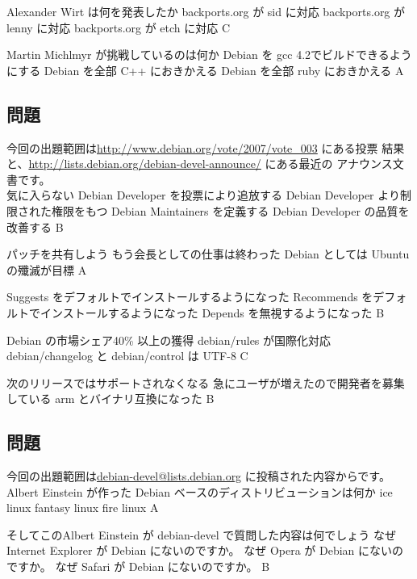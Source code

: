 \documentclass[mingoth,a4paper]{jsarticle}
\begin{document}
\santaku
{Alexander Wirt は何を発表したか}
{backports.org が sid に対応}
{backports.org が lenny に対応}
{backports.org が etch に対応}
{C}

\santaku
{Martin Michlmyr が挑戦しているのは何か}
{Debian を gcc 4.2でビルドできるようにする}
{Debian を全部 C++ におきかえる}
{Debian を全部 ruby におきかえる}
{A}

\subsection{問題}
今回の出題範囲は\url{http://www.debian.org/vote/2007/vote_003} にある投票
結果と、\url{http://lists.debian.org/debian-devel-announce/} にある最近の
アナウンス文書です。\\

{気に入らない Debian Developer を投票により追放する}
{Debian Developer より制限された権限をもつ Debian Maintainers を定義する}
{Debian Developer の品質を改善する}
{B}

{パッチを共有しよう}
{もう会長としての仕事は終わった}
{Debian としては Ubuntu の殲滅が目標}
{A}

{Suggests  をデフォルトでインストールするようになった}
{Recommends をデフォルトでインストールするようになった}
{Depends を無視するようになった}
{B}

{Debian の市場シェア40\% 以上の獲得}
{debian/rules が国際化対応}
{debian/changelog と debian/control は UTF-8}
{C}

{次のリリースではサポートされなくなる}
{急にユーザが増えたので開発者を募集している}
{arm とバイナリ互換になった}
{B}

\subsection{問題}
今回の出題範囲は\url{debian-devel@lists.debian.org} に投稿された内容からです。
\\
\santaku
{Albert Einstein が作った Debian ベースのディストリビューションは何か}
{ice linux}
{fantasy linux}
{fire linux}
{A}

\santaku
{そしてこのAlbert Einstein が debian-devel で質問した内容は何でしょう}
{なぜ Internet Explorer が Debian にないのですか。}
{なぜ Opera が Debian にないのですか。}
{なぜ Safari が Debian にないのですか。}
{B}
\end{document}

